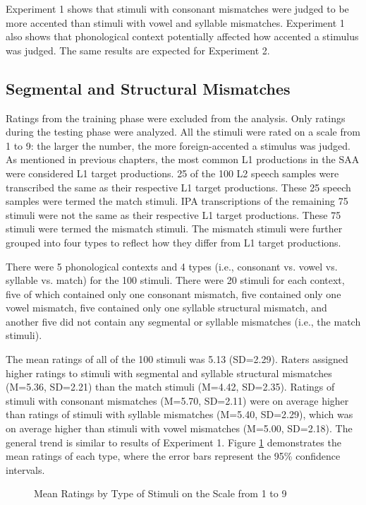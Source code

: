 Experiment 1 shows that stimuli with consonant mismatches were judged to be more accented than stimuli with vowel and syllable mismatches. Experiment 1 also shows that phonological context potentially affected how accented a stimulus was judged. The same results are expected for Experiment 2. 

\subsection{Segmental and Structural Mismatches}
Ratings from the training phase were excluded from the analysis. Only ratings during the testing phase were analyzed. All the stimuli were rated on a scale from 1 to 9: the larger the number, the more foreign-accented a stimulus was judged. As mentioned in previous chapters, the most common L1 productions in the SAA were considered L1 target productions. 25 of the 100 L2 speech samples were transcribed the same as their respective L1 target productions. These 25 speech samples were termed the match stimuli. IPA transcriptions of the remaining 75 stimuli were not the same as their respective L1 target productions. These 75 stimuli were termed the mismatch stimuli. The mismatch stimuli were further grouped into four types to reflect how they differ from L1 target productions.

There were 5 phonological contexts and 4 types (i.e., consonant vs. vowel vs. syllable vs. match) for the 100 stimuli. There were 20 stimuli for each context, five of which contained only one consonant mismatch, five contained only one vowel mismatch, five contained only one syllable structural mismatch, and another five did not contain any segmental or syllable mismatches (i.e., the match stimuli).


The mean ratings of all of the 100 stimuli was 5.13 (SD=2.29). Raters assigned higher ratings to stimuli with segmental and syllable structural mismatches (M=5.36, SD=2.21) than the match stimuli (M=4.42, SD=2.35). Ratings of stimuli with consonant mismatches (M=5.70, SD=2.11) were on average higher than ratings of stimuli with syllable mismatches (M=5.40, SD=2.29), which was on average higher than stimuli with vowel mismatches (M=5.00, SD=2.18). The general trend is similar to results of Experiment 1. Figure \ref{fig:bar2} demonstrates the mean ratings of each type, where the error bars represent the 95\% confidence intervals.

\begin{figure}[!h]
  \figSpace
\centering

\caption{Mean Ratings by Type of Stimuli on the Scale from 1 to 9}
\label{fig:bar2}
\figSpace
\end{figure}

